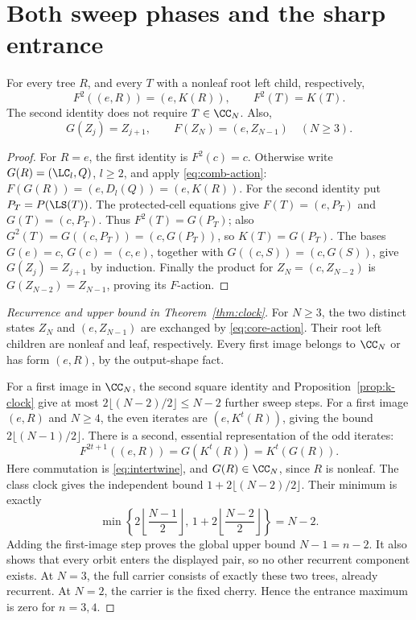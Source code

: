 \section{Both sweep phases and the sharp entrance}\label{sec:clock}

\begin{lemma}\label{lem:squares}
For every tree \(R\), and every \(T\) with a nonleaf root left child,
respectively,
\begin{equation}\label{eq:squares}
 F^2((e,R))=(e,K(R)),\qquad F^2(T)=K(T).
\end{equation}
The second identity does not require \(T\in\CC_N\). Also,
\begin{equation}\label{eq:core-action}
 G(Z_j)=Z_{j+1},\qquad F(Z_N)=(e,Z_{N-1})\quad(N\ge3).
\end{equation}
\end{lemma}

\begin{proof}
For \(R=e\), the first identity is \(F^2(c)=c\). Otherwise write
\(G(R)=(\LC_l,Q)\), \(l\ge2\), and apply \eqref{eq:comb-action}:
\(F(G(R))=(e,D_l(Q))=(e,K(R))\).
For the second identity put \(P_T=P(\LS(T))\).
The protected-cell equations give \(F(T)=(e,P_T)\) and \(G(T)=(c,P_T)\).
Thus \(F^2(T)=G(P_T)\); also
\(G^2(T)=G((c,P_T))=(c,G(P_T))\), so \(K(T)=G(P_T)\).
The bases \(G(e)=c\), \(G(c)=(c,e)\), together with
\(G((c,S))=(c,G(S))\), give \(G(Z_j)=Z_{j+1}\) by induction.
Finally the product for \(Z_N=(c,Z_{N-2})\) is \(G(Z_{N-2})=Z_{N-1}\),
proving its \(F\)-action.
\end{proof}

\begin{proof}[Recurrence and upper bound in Theorem~\ref{thm:clock}]
For \(N\ge3\), the two distinct states \(Z_N\) and \((e,Z_{N-1})\)
are exchanged by \eqref{eq:core-action}. Their root left children are
nonleaf and leaf, respectively. Every first image belongs to \(\CC_N\)
or has form \((e,R)\), by the output-shape fact.

For a first image in \(\CC_N\), the second square identity and
Proposition~\ref{prop:k-clock} give at most
\(2\lfloor(N-2)/2\rfloor\le N-2\) further sweep steps.
For a first image \((e,R)\) and \(N\ge4\), the even iterates are
\((e,K^t(R))\), giving the bound \(2\lfloor(N-1)/2\rfloor\).
There is a second, essential representation of the odd iterates:
\[
 F^{2t+1}((e,R))=G(K^t(R))=K^t(G(R)).
\]
Here commutation is \eqref{eq:intertwine}, and
\(G(R)\in\CC_N\), since \(R\) is nonleaf.
The class clock gives the independent bound
\(1+2\lfloor(N-2)/2\rfloor\). Their minimum is exactly
\[
 \min\left\{2\left\lfloor\frac{N-1}{2}\right\rfloor,\,
           1+2\left\lfloor\frac{N-2}{2}\right\rfloor\right\}=N-2.
\]
Adding the first-image step proves the global upper bound \(N-1=n-2\).
It also shows that every orbit enters the displayed pair, so no other
recurrent component exists. At \(N=3\), the full carrier consists of
exactly these two trees, already recurrent. At \(N=2\), the carrier is
the fixed cherry. Hence the entrance maximum is zero for \(n=3,4\).
\end{proof}

